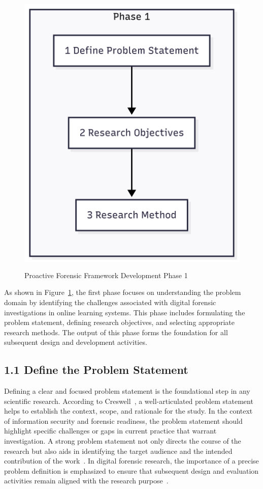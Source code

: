 \begin{figure}[H]
    \centering
    \includegraphics[height=14cm]{figure/framework-development-phase-1.png}
    \caption{Proactive Forensic Framework Development Phase 1}
    \label{fig:framework-development-phase-1}
\end{figure}

As shown in Figure~\ref{fig:framework-development-phase-1}, the first phase focuses on understanding the problem domain by identifying the challenges associated with digital forensic investigations in online learning systems. This phase includes formulating the problem statement, defining research objectives, and selecting appropriate research methods. The output of this phase forms the foundation for all subsequent design and development activities.
\subsection{1.1 Define the Problem Statement}

Defining a clear and focused problem statement is the foundational step in any scientific research. According to Creswell~\cite{creswell2014research}, a well-articulated problem statement helps to establish the context, scope, and rationale for the study. In the context of information security and forensic readiness, the problem statement should highlight specific challenges or gaps in current practice that warrant investigation. A strong problem statement not only directs the course of the research but also aids in identifying the target audience and the intended contribution of the work~\cite{webster2020writingproblem}. In digital forensic research, the importance of a precise problem definition is emphasized to ensure that subsequent design and evaluation activities remain aligned with the research purpose~\cite{casey2011digitalforensics}.

